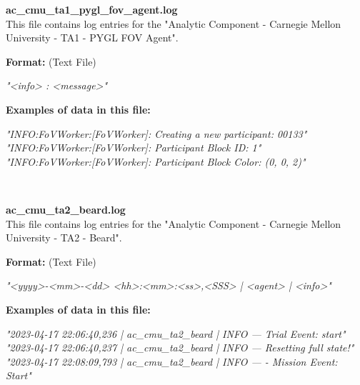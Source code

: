 \begin{description}
\begin{addmargin}[0em]{0em}
    \label{ac_cmu_ta1_pygl_fov_agent.log}
    \begin{addmargin}[1em]{0em} %
        \textbf{ac\_cmu\_ta1\_pygl\_fov\_agent.log}\\
        This file contains log entries for the "Analytic Component - Carnegie Mellon University - TA1 - PYGL FOV Agent".
        \begin{addmargin}[1em]{0em}
            \textbf{Format:} (Text File)
            \begin{addmargin}[1em]{0em}
                \textit{"<info> : <message>"}
            \end{addmargin}
        \end{addmargin}
        \begin{addmargin}[1em]{0em}
            \textbf{Examples of data in this file:}
            \begin{addmargin}[1em]{0em}\textit{"INFO:FoVWorker:[FoVWorker]:  Creating a new participant: 00133"\\
                "INFO:FoVWorker:[FoVWorker]:  Participant Block ID: 1"\\
                "INFO:FoVWorker:[FoVWorker]:  Participant Block Color: (0, 0, 2)"}
            \end{addmargin}
        \end{addmargin}
    \end{addmargin} %
    \textbf{\\}

    \label{ac_cmu_ta2_beard.log}
    \begin{addmargin}[1em]{0em} %
        \textbf{ac\_cmu\_ta2\_beard.log}\\
        This file contains log entries for the "Analytic Component - Carnegie Mellon University - TA2 - Beard".
        \begin{addmargin}[1em]{0em}
            \textbf{Format:} (Text File)
            \begin{addmargin}[1em]{0em}
                \textit{"<yyyy>-<mm>-<dd> <hh>:<mm>:<ss>,<SSS> | <agent> | <info>"}
            \end{addmargin}
        \end{addmargin}
        \begin{addmargin}[1em]{0em}
            \textbf{Examples of data in this file:}
            \begin{addmargin}[1em]{0em}\textit{"2023-04-17 22:06:40,236 | ac\_cmu\_ta2\_beard | INFO — Trial Event: start"\\
                "2023-04-17 22:06:40,237 | ac\_cmu\_ta2\_beard | INFO — Resetting full state!"\\
                "2023-04-17 22:08:09,793 | ac\_cmu\_ta2\_beard | INFO — - Mission Event: Start"}
            \end{addmargin}
        \end{addmargin}
    \end{addmargin} %
    \textbf{\\}


\end{addmargin}
\end{description}
